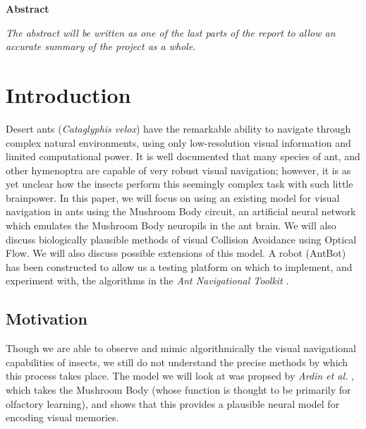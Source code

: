 \documentclass[a4paper,11pt,twoside,openright]{article}
\let\oldsection\section
\def\section{\cleardoublepage\oldsection}
\begin{document}
\newpage
\centering
{\LARGE\textbf{Abstract}}
\begin{flushleft}
  {\small \textit{The abstract will be written as one of the last parts of the report to allow
    an accurate summary of the project as a whole.}}
\end{flushleft}

\newpage


\tableofcontents

\newpage

\listoffigures
\newpage

\listoftables
\newpage

\raggedright
\section{ Introduction }
Desert ants (\textit{Cataglyphis velox}) have the
remarkable ability to navigate through complex natural environments, using only low-resolution
visual information and limited computational power. It is well documented that many species of
ant, and other hymenoptra are capable of very robust visual navigation; however, it is as yet
unclear how the insects perform this seemingly complex task with such little brainpower. In this
paper, we will focus on using an existing model for visual navigation
in ants using
the Mushroom Body circuit, an artificial neural network which emulates the Mushroom Body neuropils
in the ant brain. We will also discuss biologically plausible methods of visual Collision Avoidance
using Optical Flow. We will also discuss possible extensions of this model. A robot (AntBot) has been
constructed \cite{Eberding2016} to allow us a testing platform on which to implement,
and experiment with, the algorithms in the \textit{Ant Navigational Toolkit} \cite{Wehner2009}.

\subsection{ Motivation }
Though we are able to observe and mimic algorithmically the visual navigational capabilities
of insects, we still do not understand the precise methods by which this process takes place. The
model we will look at was propsed by \textit{Ardin et al.} \cite{Ardin2016}, which takes
the Mushroom Body (whose function is thought to be primarily for olfactory learning), and shows
that this provides a plausible neural model for encoding visual memories.
\newline
\end{document}
